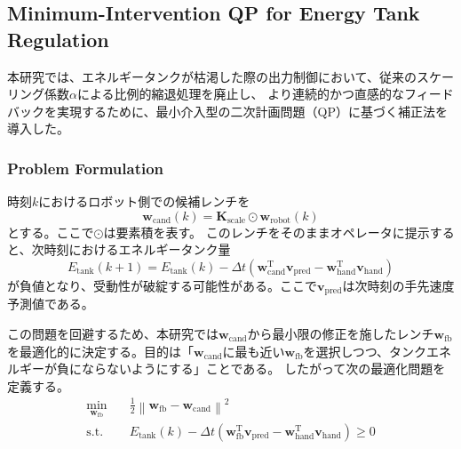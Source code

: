 \documentclass[uplatex]{jsarticle}
\begin{document}
\subsection{Minimum-Intervention QP for Energy Tank Regulation}
本研究では、エネルギータンクが枯渇した際の出力制御において、従来のスケーリング係数$\alpha$による比例的縮退処理を廃止し、
より連続的かつ直感的なフィードバックを実現するために、最小介入型の二次計画問題（QP）に基づく補正法を導入した。

\subsubsection{Problem Formulation}
時刻$k$におけるロボット側での候補レンチを
\begin{equation}
 \boldsymbol{w}_{\mathrm{cand}}(k) = \boldsymbol{K}_{\mathrm{scale}} \odot \boldsymbol{w}_{\mathrm{robot}}(k)
\end{equation}
とする。ここで$\odot$は要素積を表す。
このレンチをそのままオペレータに提示すると、次時刻におけるエネルギータンク量
\begin{equation}
E_{\mathrm{tank}}(k+1) = E_{\mathrm{tank}}(k) - \Delta t \left( \boldsymbol{w}_{\mathrm{cand}}^{\mathrm{T}} \boldsymbol{v}_{\mathrm{pred}} - \boldsymbol{w}_{\mathrm{hand}}^{\mathrm{T}} \boldsymbol{v}_{\mathrm{hand}} \right)
\end{equation}
が負値となり、受動性が破綻する可能性がある。ここで$\boldsymbol{v}_{\mathrm{pred}}$は次時刻の手先速度予測値である。

この問題を回避するため、本研究では$\boldsymbol{w}_{\mathrm{cand}}$から最小限の修正を施したレンチ$\boldsymbol{w}_{\mathrm{fb}}$を最適化的に決定する。目的は「$\boldsymbol{w}_{\mathrm{cand}}$に最も近い$\boldsymbol{w}_{\mathrm{fb}}$を選択しつつ、タンクエネルギーが負にならないようにする」ことである。  
したがって次の最適化問題を定義する。
\begin{align}
 \min_{\boldsymbol{w}_{\mathrm{fb}}} \quad & \frac{1}{2} \left\| \boldsymbol{w}_{\mathrm{fb}} - \boldsymbol{w}_{\mathrm{cand}} \right\|^2 \label{eq:qp_obj}\\
 \mathrm{s.t.} \quad &
 E_{\mathrm{tank}}(k) - \Delta t \left( \boldsymbol{w}_{\mathrm{fb}}^{\mathrm{T}} \boldsymbol{v}_{\mathrm{pred}} - \boldsymbol{w}_{\mathrm{hand}}^{\mathrm{T}} \boldsymbol{v}_{\mathrm{hand}} \right) \ge 0 \label{eq:qp_const}
\end{align}
\end{document}
